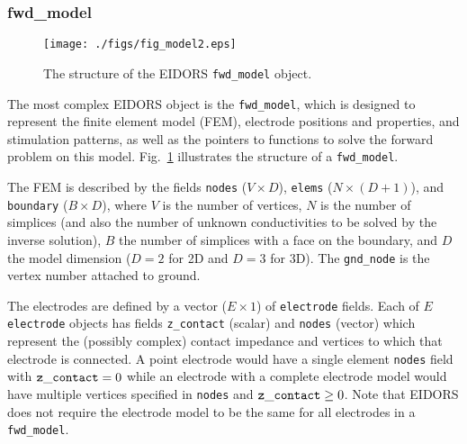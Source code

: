\documentclass[12pt]{iopart}
\begin{document}
\subsubsection{fwd\_model}

%
%
\begin{figure}[th]
\begin{flushright}
\texttt{[image: ./figs/fig\_model2.eps]}
\caption{\small The structure of the EIDORS {\tt fwd\_model} object.
\label{fig:fwd_model}
 }
\end{flushright}
\end{figure}


The most complex EIDORS object is the {\tt fwd\_model},
which is designed to represent the finite element model 
(FEM), electrode
positions and properties, and stimulation patterns, as
well as the pointers to functions to solve the forward
problem on this model. Fig.~\ref{fig:fwd_model} illustrates
the structure of a {\tt fwd\_model}.

The FEM is described by the fields
{\tt nodes} ($V{\times}D$),
{\tt elems} ($N{\times}(D+1)$), and
{\tt boundary} ($B{\times}D$), where
$V$ is the number of vertices, $N$ is the number of
simplices (and also the number of unknown conductivities
to be solved by the inverse solution), $B$ the number
of simplices with a face on the boundary, and $D$ the
model dimension ($D=2$ for 2D and $D=3$ for 3D).
The {\tt gnd\_node} is the vertex number attached to ground.

The electrodes are defined by a vector ($E\times1$) of
{\tt electrode} fields. Each of $E$ {\tt electrode}
objects has fields
{\tt z\_contact} (scalar) and {\tt nodes} (vector)
 which represent the
(possibly complex) contact impedance
and vertices to which that electrode is connected.
A point electrode would have a single element
{\tt nodes} field with ${\tt z\_contact}=0$ while
an electrode with a complete electrode model
would have multiple vertices specified in {\tt nodes}
and ${\tt z\_contact}\ge0$. Note that EIDORS
does not require the electrode model to be the same
for all electrodes in a {\tt fwd\_model}.
\end{document}
